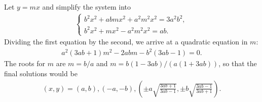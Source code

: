 \begin{solution}
    Let $y=mx$ and simplify the system into
        \begin{align*}
            \begin{cases}
                b^2x^2+abmx^2+a^2m^2x^2=3a^2b^2,\\b^2x^2+mx^2-a^2m^2x^2=ab.
            \end{cases}
        \end{align*}
        Dividing the first equation by the second, we arrive at a quadratic equation in $m$:
        \begin{align*}
            a^2(3ab+1)m^2-2abm-b^2(3ab-1)=0.
        \end{align*}
        The roots for $m$ are $m=b/a$ and $m=b(1-3ab)/(a(1+3ab))$, so that the final solutions would be
        \begin{align*}
            (x,y)=(a,b),(-a,-b),\left(\pm a\sqrt{\frac{3ab+1}{3ab-1}}, \pm b\sqrt{\frac{3ab-1}{3ab+1}}\right).
        \end{align*}
\end{solution}


